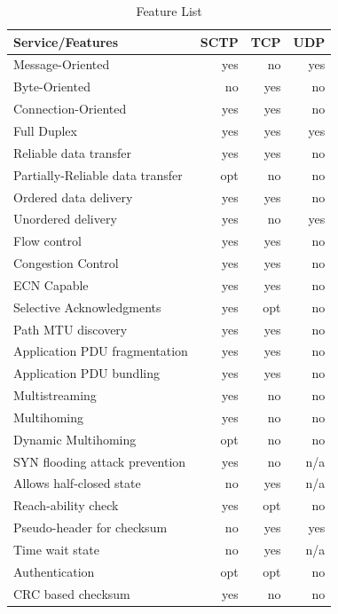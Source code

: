 \documentclass[conference]{IEEEtran}
\begin{document}
\begin{table}
\begin{center}
\begin{tabular}{|l|r|r|r|}
\hline
Service/Features               & SCTP & TCP & UDP \\\hline
\hline
Message-Oriented               & yes  & no  & yes \\\hline 
Byte-Oriented                  & no   & yes & no  \\\hline
Connection-Oriented            & yes  & yes & no  \\\hline
Full Duplex                    & yes  & yes & yes \\\hline
Reliable data transfer         & yes  & yes & no  \\\hline
Partially-Reliable data transfer & opt  & no  & no  \\\hline
Ordered data delivery          & yes  & yes & no  \\\hline
Unordered delivery             & yes  & no  & yes \\\hline
Flow control                   & yes  & yes & no  \\\hline
Congestion Control             & yes  & yes & no  \\\hline
ECN Capable                    & yes  & yes & no  \\\hline
Selective Acknowledgments      & yes  & opt & no  \\\hline
Path MTU discovery             & yes  & yes & no  \\\hline
Application PDU fragmentation  & yes  & yes & no  \\\hline
Application PDU bundling       & yes  & yes & no  \\\hline
Multistreaming                 & yes  & no  & no  \\\hline
Multihoming                    & yes  & no  & no  \\\hline
Dynamic Multihoming            & opt  & no  & no  \\\hline
SYN flooding attack prevention & yes  & no  & n/a \\\hline
Allows half-closed state       & no   & yes & n/a \\\hline
Reach-ability check            & yes  & opt & no  \\\hline
Pseudo-header for checksum     & no   & yes & yes \\\hline
Time wait state                & no   & yes & n/a \\\hline
Authentication                 & opt  & opt & no  \\\hline
CRC based checksum             & yes  & no  & no  \\\hline
\end{tabular}
\end{center}
\caption{Feature List \label{features}}
\end{table}
\end{document}
